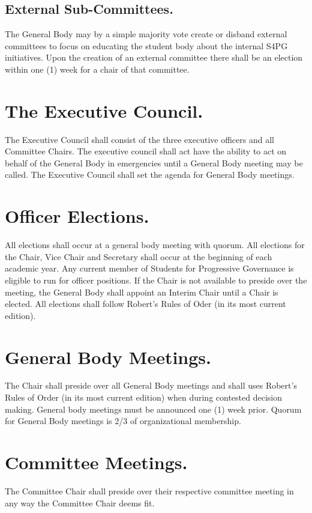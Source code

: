 \documentclass[12pt,letterpaper]{constitution}
\begin{document}
\subsection{External Sub-Committees.}
The General Body may by a simple majority vote create or disband external committees to focus on educating the student body about the internal S4PG initiatives. Upon the creation of an external committee there shall be an election within one (1) week for a chair of that committee.

\section{The Executive Council.}
The Executive Council shall consist of the three executive officers and all Committee Chairs.  The executive council shall act have the ability to act on behalf of the General Body in emergencies until a General Body meeting may be called.   The Executive Council shall set the agenda for General Body meetings.  


\section{Officer Elections.}
All elections shall occur at a general body meeting with quorum.  All elections for the Chair, Vice Chair and Secretary shall occur at the beginning of each academic year.  Any current member of Students for Progressive Governance is eligible to run for officer positions.  If the Chair is not available to preside over the meeting, the General Body shall appoint an Interim Chair until a Chair is elected.  All elections shall follow Robert’s Rules of Oder (in its most current edition).

\section{General Body Meetings.}
The Chair shall preside over all General Body meetings and shall uses Robert’s Rules of Order (in its most current edition) when during contested decision making.  General body meetings must be announced one (1) week prior.  Quorum for General Body meetings is 2/3 of organizational membership.

\section{Committee Meetings.}
The Committee Chair shall preside over their respective committee meeting in any way the Committee Chair deems fit.
\end{document}
